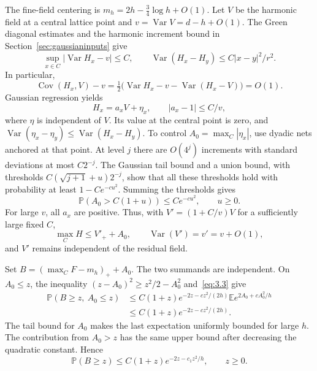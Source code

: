\documentclass[11pt,a4paper]{article}
\numberwithin{equation}{section}
\theoremstyle{remark}
\DeclareMathOperator{\Var}{Var}
\DeclareMathOperator{\Cov}{Cov}
\begin{document}
The fine-field centering is $m_h=2h-\tfrac34\log h+O(1)$. Let $V$ be the harmonic field at a central lattice point and $v=\Var V=d-h+O(1)$. The Green diagonal estimates and the harmonic increment bound in Section~\ref{sec:gaussianinputs} give
\[
\sup_{x\in C}|\Var H_x-v|\le C,
\qquad
\Var(H_x-H_y)\le C|x-y|^2/r^2.
\]
In particular,
\[
\Cov(H_x,V)-v
=\tfrac12\bigl(\Var H_x-v-\Var(H_x-V)\bigr)=O(1).
\]
Gaussian regression yields
\begin{equation}\label{eq:4.6}
H_x=a_xV+\eta_x,\qquad |a_x-1|\le C/v,
\end{equation}
where $\eta$ is independent of $V$. Its value at the central point is zero, and
$\Var(\eta_x-\eta_y)\le\Var(H_x-H_y)$.
To control $A_0=\max_C|\eta_x|$, use dyadic nets anchored at that point. At level $j$ there are $O(4^j)$ increments with standard deviations at most $C2^{-j}$. The Gaussian tail bound and a union bound, with thresholds
$C(\sqrt{j+1}+u)2^{-j}$, show that all these thresholds hold with probability at least $1-Ce^{-cu^2}$. Summing the thresholds gives
\[
\mathbb P(A_0>C(1+u))\le Ce^{-cu^2},\qquad u\ge0.
\]
For large $v$, all $a_x$ are positive. Thus, with $V'=(1+C/v)V$ for a sufficiently large fixed $C$,
\[
\max_C H\le V'_++A_0,\qquad \Var(V')=v'=v+O(1),
\]
and $V'$ remains independent of the residual field.

Set $B=(\max_CF-m_h)_++A_0$. The two summands are independent. On $A_0\le z$, the inequality
$(z-A_0)^2\ge z^2/2-A_0^2$ and~\eqref{eq:3.3} give
\[
\begin{split}
\mathbb P(B\ge z,\ A_0\le z)
&\le C(1+z)e^{-2z-cz^2/(2h)}
 \mathbb E e^{2A_0+cA_0^2/h}\\
&\le C(1+z)e^{-2z-cz^2/(2h)}.
\end{split}
\]
The tail bound for $A_0$ makes the last expectation uniformly bounded for large $h$. The contribution from $A_0>z$ has the same upper bound after decreasing the quadratic constant. Hence
\begin{equation}\label{eq:4.7}
\mathbb P(B\ge z)\le C(1+z)e^{-2z-c_1z^2/h},\qquad z\ge0.
\end{equation}
\end{document}
